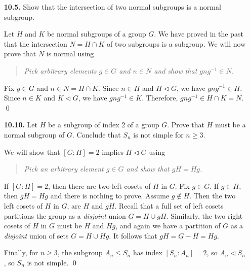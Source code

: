\documentclass[12pt,reqno]{amsart}
\newcommand{\<}{\ensuremath{\langle}}
\renewcommand{\>}{\ensuremath{\rangle}}
\begin{document}
\begin{enumerate}
\begin{enumerate}
 
\end{enumerate}

\bigskip

\item[{\bf 10.5.}]
Show that the intersection of two normal subgroups is a normal
subgroup. 
 
\medskip
{} Let $H$ and $K$ be normal subgroups of a group $G$.
We have proved in the past that the intersection $N = H\cap K$ of two subgroups
is a subgroup.  We will now prove that $N$ is normal using\\[4pt]
\medskip
\begin{quote}
\emph{Pick arbitrary elements $g\in G$ and $n\in N$ and show that $gng^{-1} \in N$.}
\end{quote}
\medskip
Fix $g\in G$ and $n \in N = H\cap K$.  
Since $n \in H$ and $H \triangleleft G$, we have $gng^{-1} \in H$.
Since $n \in K$ and $K \triangleleft G$, we have $gng^{-1} \in K$.
Therefore, $gng^{-1} \in H\cap K = N$.
\qed
\bigskip

\item[{\bf 10.10.}]
Let $H$ be a subgroup of index 2 of a group $G$. Prove that $H$ must
be a normal subgroup of $G$. Conclude that $S_n$ is not simple for $n \geq 3$.

\medskip
{} We will show that $[G:H]=2$ implies $H\triangleleft G$
using\\[4pt]
\medskip
\begin{quote}
\emph{Pick an arbitrary element $g\in G$ and show that $gH = Hg$.}
\end{quote}
\medskip
If $[G:H]=2$, then there are two left cosets of $H$ in $G$.
Fix $g \in G$. If $g \in H$, then $gH = Hg$ and there is nothing to prove.
Assume $g \notin H$.  Then the two left cosets of $H$ in $G$, 
are $H$ and $gH$. Recall that a full set of left cosets partitions the group as a
\emph{disjoint} union $G = H \cup gH$.  Similarly, the two right cosets of $H$ in
$G$ must be $H$ and $Hg$, and again we have a partition of $G$ as a
\emph{disjoint} union of sets $G = H \cup Hg$.  It follows that $gH = G-H = Hg$.

\medskip

Finally, for $n \geq 3$, the subgroup $A_n \leq S_n$ has index
$[S_n: A_n] = 2$, so $A_n \triangleleft S_n$, so $S_n$ is not simple.
\qed

\bigskip


\end{enumerate}
\end{document}
